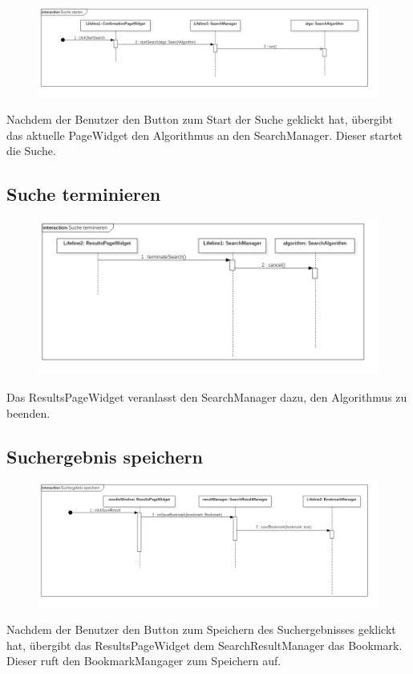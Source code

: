 \begin{figure}[H]
\centering
\includegraphics[width=\linewidth]{img/Sequenzdiagramme/SucheStarten}
\label{fig:sucheStarten}
\end{figure}
Nachdem der Benutzer den Button zum Start der Suche geklickt hat, übergibt das aktuelle PageWidget den Algorithmus an den SearchManager. Dieser startet die Suche.

\subsection{Suche terminieren}

\begin{figure}[H]
\centering
\includegraphics[width=\linewidth]{img/Sequenzdiagramme/SucheTerminieren}
\label{fig:sucheTerminieren}
\end{figure}
Das ResultsPageWidget veranlasst den SearchManager dazu, den Algorithmus zu beenden.

\subsection{Suchergebnis speichern}

\begin{figure}[H]
\centering
\includegraphics[width=\linewidth]{img/Sequenzdiagramme/SuchergebnisSpeichern}
\label{fig:suchergebnisSpeichern}
\end{figure}
Nachdem der Benutzer den Button zum Speichern des Suchergebnisses geklickt hat, übergibt das ResultsPageWidget dem SearchResultManager das Bookmark. Dieser ruft den BookmarkMangager zum Speichern auf.